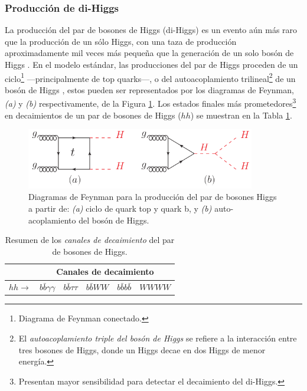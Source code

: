 \subsubsection{Producción de di-Higgs}

La producción del par de bosones de Higgs (di-Higgs) es un evento aún más raro que la producción de un sólo Higgs, con una taza de producción aproximadamente mil veces más pequeña que la generación de un solo bosón de Higgs \cite{doublehWP}.
%
En el modelo estándar, las producciones del par de Higgs proceden de un ciclo\footnote{Diagrama de Feynman conectado.} ---principalmente de top quarks---, o del autoacoplamiento trilineal\footnote{El \textit{autoacoplamiento triple del bosón de Higgs} se refiere a la interacción entre tres bosones de Higgs, donde un Higgs decae en dos Higgs de menor energía.} de un bosón de Higgs \cite{DiVita2017}, estos pueden ser representados por los diagramas de Feynman, \emph{(a)} y \emph{(b)} respectivamente, de la Figura \ref{fig:pchan2}. 
%
Los estados finales más prometedores\footnote{Presentan mayor sensibilidad para detectar el decaimiento del di-Higgs.} en decaimientos de un par de bosones de Higgs ($hh$) se muestran en la Tabla \ref{tab:decays2}.
%
%
\begin{figure}[h]
  \centering
  \includegraphics[width=10cm]{figures/image9.png}
  \caption[Diagramas de Feynman para la producción del par de bosones Higgs.]{Diagramas de Feynman para la producción del par de bosones Higgs a partir de: \emph{(a)} ciclo de quark top y quark b, y \emph{(b)} auto-acoplamiento del bosón de Higgs.
  }
  \label{fig:pchan2}
\end{figure}

\begin{table}[h]
\centering
\begin{tabular}{c|c|c|c|c|c|}
\cline{2-6}
 & \multicolumn{5}{c|}{Canales de decaimiento} \\ \hline
\multicolumn{1}{|l|}{$hh \rightarrow$} & $b\bar{b}\gamma\gamma$ & $b\bar{b}\tau\tau$ & $b\bar{b}WW$ & $b\bar{b}b\bar{b}$ & $WWWW$ \\ \hline
\end{tabular}
\caption[Resumen de los \textit{canales de decaimiento} del par de bosones de Higgs.]{Resumen de los \textit{canales de decaimiento} del par de bosones de Higgs. 
}
\label{tab:decays2}
\end{table}

